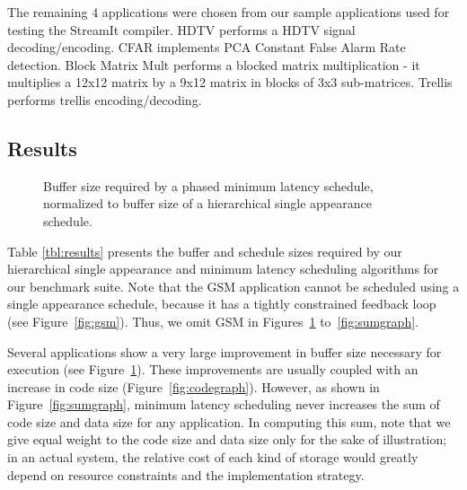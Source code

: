 The remaining 4 applications were chosen from our sample applications
used for testing the StreamIt compiler. HDTV performs a HDTV signal
decoding/encoding. CFAR implements PCA Constant False Alarm Rate
detection. Block Matrix Mult performs a blocked matrix multiplication
- it multiplies a 12x12 matrix by a 9x12 matrix in blocks of 3x3
sub-matrices. Trellis performs trellis encoding/decoding.

\begin{comment}

\subsection{Methodology}
\label{sec:results:methodology}

The following data has been collected: number of nodes, number of
node executions per steady state, schedule size and buffer size
for pseudo single appearance and minimal latency schedules.

\subsubsection{Schedule Compression}

\end{comment}

\subsection{Results}
\label{sec:results:results}

\begin{figure}[t]
\vspace{6pt}
\caption{\small Buffer size required by a phased minimum latency schedule,
normalized to buffer size of a hierarchical single appearance
schedule.\protect\label{fig:buffergraph}}
\vspace{-6pt}
\end{figure}

Table \ref{tbl:results} presents the buffer and schedule sizes
required by our hierarchical single appearance and minimum latency
scheduling algorithms for our benchmark suite.  Note that the GSM
application cannot be scheduled using a single appearance schedule,
because it has a tightly constrained feedback loop (see
Figure~\ref{fig:gsm}).  Thus, we omit GSM in
Figures~\ref{fig:buffergraph} to~\ref{fig:sumgraph}.

Several applications show a very large improvement in buffer size
necessary for execution (see Figure~\ref{fig:buffergraph}).  These
improvements are usually coupled with an increase in code size
(Figure~\ref{fig:codegraph}).  However, as shown in
Figure~\ref{fig:sumgraph}, minimum latency scheduling never increases
the sum of code size and data size for any application.  In computing
this sum, note that we give equal weight to the code size and data
size only for the sake of illustration; in an actual system, the
relative cost of each kind of storage would greatly depend on resource
constraints and the implementation strategy.

